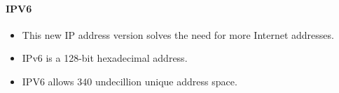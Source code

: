 \begin{flushleft}
\begin{itemize}
	\paragraph{IPV6}
	\begin{itemize}
		\item This new IP address version solves the need for more Internet addresses.
		\item IPv6 is a 128-bit hexadecimal address.
		\item IPV6 allows 340 undecillion unique address space.
	\end{itemize}
\end{itemize}
	
\end{flushleft}



